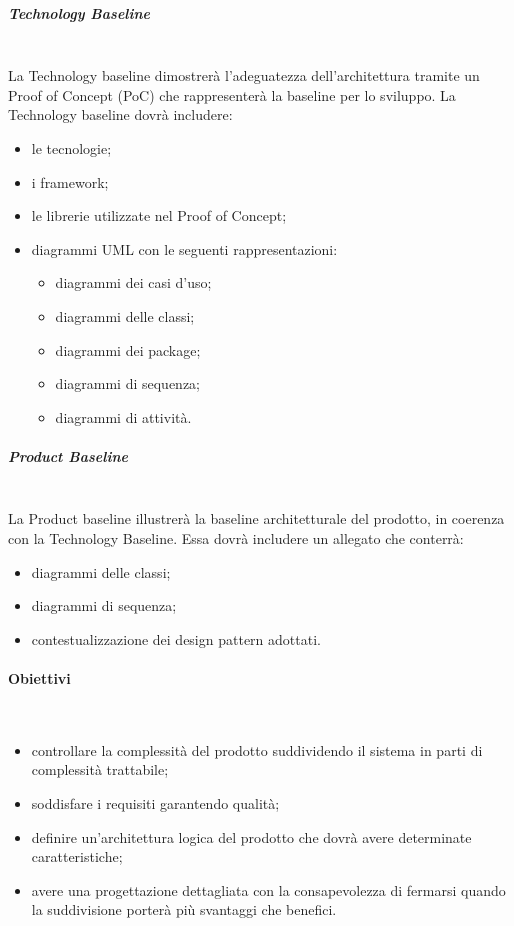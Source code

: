 \subparagraph{Technology Baseline}\mbox{}\\
La Technology baseline dimostrerà l’adeguatezza dell’architettura tramite un Proof of Concept (PoC) che rappresenterà la baseline per lo sviluppo. 
La Technology baseline dovrà includere:
\begin{itemize}
	\item le tecnologie;
	\item i framework;
	\item le librerie utilizzate nel Proof of Concept;
	\item diagrammi UML con le seguenti rappresentazioni:
	\begin{itemize}
		\item diagrammi dei casi d'uso; 
		\item diagrammi delle classi; 
		\item diagrammi dei package;
		\item diagrammi di sequenza; 
		\item diagrammi di attività.
	\end{itemize}
\end{itemize}

\subparagraph{Product Baseline}\mbox{}\\
La Product baseline illustrerà la baseline architetturale del prodotto, in coerenza con la Technology Baseline.
Essa dovrà includere un allegato che conterrà:
\begin{itemize}
	\item diagrammi delle classi;
	\item diagrammi di sequenza;
	\item contestualizzazione dei design pattern adottati.	
\end{itemize}

\paragraph{Obiettivi}\mbox{}\\
\begin{itemize}
	\item controllare la complessità del prodotto suddividendo il sistema in parti di complessità trattabile;
	\item soddisfare i requisiti garantendo qualità;
	\item definire un’architettura logica del prodotto che dovrà avere determinate caratteristiche;
	\item avere una progettazione dettagliata con la consapevolezza di fermarsi quando la suddivisione porterà più svantaggi che benefici.
\end{itemize}
